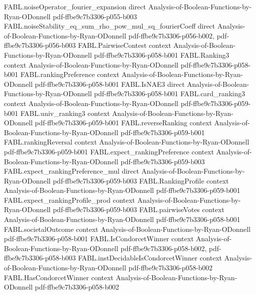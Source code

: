 \begin{theorem}
  {FABL.noiseOperator_fourier_expansion}
  {direct}
  {Analysis-of-Boolean-Functions-by-Ryan-ODonnell}
  {pdf-ffbe9c7b3306-p055-b003}
\proofstep
  {FABL.noiseStability_eq_sum_rho_pow_mul_sq_fourierCoeff}
  {direct}
  {Analysis-of-Boolean-Functions-by-Ryan-ODonnell}
  {pdf-ffbe9c7b3306-p056-b002,
    pdf-ffbe9c7b3306-p056-b003}
\proofstep
  {FABL.PairwiseContest}
  {context}
  {Analysis-of-Boolean-Functions-by-Ryan-ODonnell}
  {pdf-ffbe9c7b3306-p058-b001}
\proofstep
  {FABL.Ranking3}
  {context}
  {Analysis-of-Boolean-Functions-by-Ryan-ODonnell}
  {pdf-ffbe9c7b3306-p058-b001}
\proofstep
  {FABL.rankingPreference}
  {context}
  {Analysis-of-Boolean-Functions-by-Ryan-ODonnell}
  {pdf-ffbe9c7b3306-p058-b001}
\proofstep
  {FABL.IsNAE3}
  {direct}
  {Analysis-of-Boolean-Functions-by-Ryan-ODonnell}
  {pdf-ffbe9c7b3306-p058-b001}
\proofstep
  {FABL.card_ranking3}
  {context}
  {Analysis-of-Boolean-Functions-by-Ryan-ODonnell}
  {pdf-ffbe9c7b3306-p059-b001}
\proofstep
  {FABL.univ_ranking3}
  {context}
  {Analysis-of-Boolean-Functions-by-Ryan-ODonnell}
  {pdf-ffbe9c7b3306-p059-b001}
\proofstep
  {FABL.reverseRanking}
  {context}
  {Analysis-of-Boolean-Functions-by-Ryan-ODonnell}
  {pdf-ffbe9c7b3306-p059-b001}
\proofstep
  {FABL.rankingReversal}
  {context}
  {Analysis-of-Boolean-Functions-by-Ryan-ODonnell}
  {pdf-ffbe9c7b3306-p059-b001}
\proofstep
  {FABL.expect_rankingPreference}
  {context}
  {Analysis-of-Boolean-Functions-by-Ryan-ODonnell}
  {pdf-ffbe9c7b3306-p059-b003}
\proofstep
  {FABL.expect_rankingPreference_mul}
  {direct}
  {Analysis-of-Boolean-Functions-by-Ryan-ODonnell}
  {pdf-ffbe9c7b3306-p059-b003}
\proofstep
  {FABL.RankingProfile}
  {context}
  {Analysis-of-Boolean-Functions-by-Ryan-ODonnell}
  {pdf-ffbe9c7b3306-p059-b001}
\proofstep
  {FABL.expect_rankingProfile_prod}
  {context}
  {Analysis-of-Boolean-Functions-by-Ryan-ODonnell}
  {pdf-ffbe9c7b3306-p059-b003}
\proofstep
  {FABL.pairwiseVotes}
  {context}
  {Analysis-of-Boolean-Functions-by-Ryan-ODonnell}
  {pdf-ffbe9c7b3306-p058-b001}
\proofstep
  {FABL.societalOutcome}
  {context}
  {Analysis-of-Boolean-Functions-by-Ryan-ODonnell}
  {pdf-ffbe9c7b3306-p058-b001}
\proofstep
  {FABL.IsCondorcetWinner}
  {context}
  {Analysis-of-Boolean-Functions-by-Ryan-ODonnell}
  {pdf-ffbe9c7b3306-p058-b002,
    pdf-ffbe9c7b3306-p058-b003}
\proofstep
  {FABL.instDecidableIsCondorcetWinner}
  {context}
  {Analysis-of-Boolean-Functions-by-Ryan-ODonnell}
  {pdf-ffbe9c7b3306-p058-b002}
\proofstep
  {FABL.HasCondorcetWinner}
  {context}
  {Analysis-of-Boolean-Functions-by-Ryan-ODonnell}
  {pdf-ffbe9c7b3306-p058-b002}

\end{theorem}
